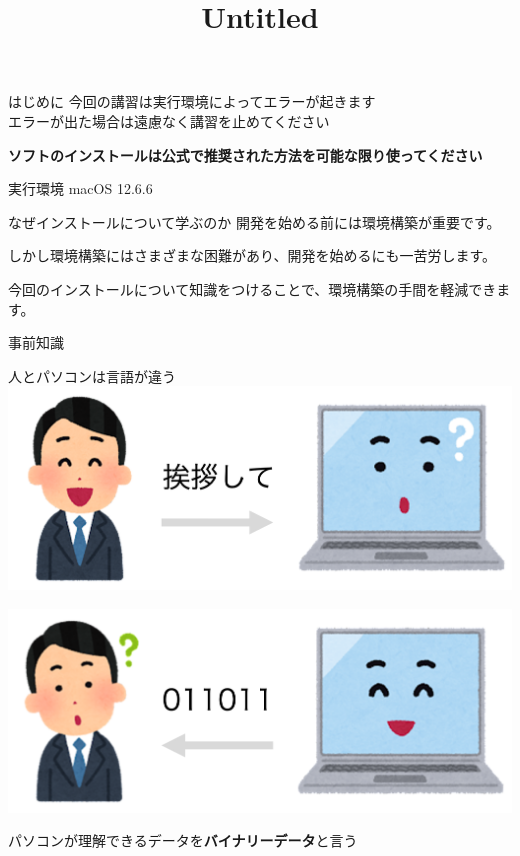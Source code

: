\documentclass[
  ignorenonframetext,
]{beamer}
\title{Untitled}
\author{}
\date{}
\begin{document}
\frame{\titlepage}
\ifdefined\Shaded\renewenvironment{Shaded}{\begin{tcolorbox}[interior hidden, sharp corners, borderline west={3pt}{0pt}{shadecolor}, frame hidden, breakable, boxrule=0pt, enhanced]}{\end{tcolorbox}}\fi

\begin{frame}{はじめに}
\protect\hypertarget{ux306fux3058ux3081ux306b}{}
今回の講習は実行環境によってエラーが起きます\\
エラーが出た場合は遠慮なく講習を止めてください

\textbf{ソフトのインストールは公式で推奨された方法を可能な限り使ってください}

実行環境 macOS 12.6.6
\end{frame}

\begin{frame}{なぜインストールについて学ぶのか}
\protect\hypertarget{ux306aux305cux30a4ux30f3ux30b9ux30c8ux30fcux30ebux306bux3064ux3044ux3066ux5b66ux3076ux306eux304b}{}
開発を始める前には環境構築が重要です。

しかし環境構築にはさまざまな困難があり、開発を始めるにも一苦労します。

今回のインストールについて知識をつけることで、環境構築の手間を軽減できます。
\end{frame}

\begin{frame}{事前知識}
\protect\hypertarget{ux4e8bux524dux77e5ux8b58}{}
\end{frame}

\begin{frame}{人とパソコンは言語が違う}
\protect\hypertarget{ux4ebaux3068ux30d1ux30bdux30b3ux30f3ux306fux8a00ux8a9eux304cux9055ux3046}{}
\includegraphics[width=6.25in,height=\textheight]{image/human_hello.png}

\includegraphics[width=6.25in,height=\textheight]{image/pc_hello.png}

パソコンが理解できるデータを\textbf{バイナリーデータ}と言う
\end{frame}
\end{document}
